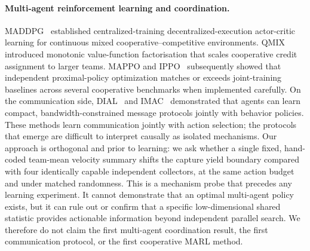 \documentclass{article}
\begin{document}
\paragraph{Multi-agent reinforcement learning and coordination.}
MADDPG~\cite{lowe2017maddpg} established centralized-training
decentralized-execution actor-critic learning for continuous mixed
cooperative--competitive environments. QMIX~\cite{rashid2018qmix} introduced
monotonic value-function factorisation that scales cooperative credit assignment
to larger teams. MAPPO and IPPO~\cite{yu2022mappo} subsequently showed that
independent proximal-policy optimization matches or exceeds joint-training
baselines across several cooperative benchmarks when implemented carefully.
On the communication side, DIAL~\cite{foerster2016dial} and
IMAC~\cite{wang2020imac} demonstrated that agents can learn compact,
bandwidth-constrained message protocols jointly with behavior policies. These
methods learn communication jointly with action selection; the protocols that
emerge are difficult to interpret causally as isolated mechanisms. Our
approach is orthogonal and prior to learning: we ask whether a single fixed,
hand-coded team-mean velocity summary shifts the capture yield boundary compared
with four identically capable independent collectors, at the same action budget
and under matched randomness. This is a mechanism probe that precedes any
learning experiment. It cannot demonstrate that an optimal multi-agent policy
exists, but it can rule out or confirm that a specific low-dimensional shared
statistic provides actionable information beyond independent parallel search.
We therefore do not claim the first multi-agent coordination result, the first
communication protocol, or the first cooperative MARL method.
\end{document}
